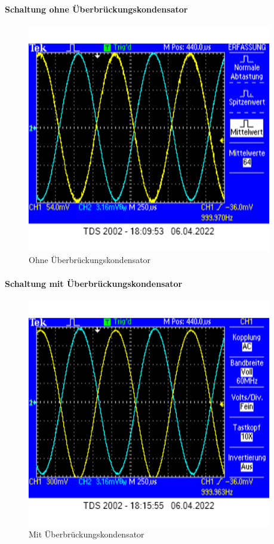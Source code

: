 \documentclass[12pt,english,ngerman]{scrartcl}
\begin{document}
\paragraph{Schaltung ohne Überbrückungskondensator}
\begin{figure}[H]
  \centering
    \includegraphics[width=\linewidth, height=10cm]{./figures/messungen/ohnekond24mv.png}
  \caption{Ohne Überbrückungskondensator}
  \label{fig:oszi_ohne_normal}
\end{figure}

\paragraph{Schaltung mit Überbrückungskondensator}
\begin{figure}[H]
  \centering
    \includegraphics[width=\linewidth, height=10cm]{./figures/messungen/mitkond24mv.png}
  \caption{Mit Überbrückungskondensator}
  \label{fig:oszi_mit_normal}
\end{figure}
\end{document}
